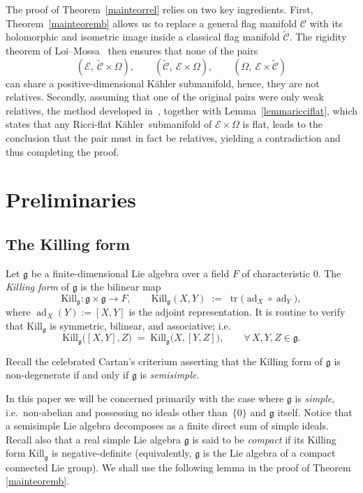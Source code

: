 \documentclass[reqno]{amsart}
\newcommand{\K}{K\"{a}hler}
\newcommand{\Kill}{{\mathrm{Kill}}}
\begin{document}
The proof of Theorem~\ref{mainteorrel} relies on two key ingredients.  
First, Theorem~\ref{mainteoremb} allows us to replace a general flag manifold 
\(\mathcal{C}\) with its holomorphic and isometric image inside a classical flag manifold 
\(\widetilde{\mathcal{C}}\). The rigidity theorem of Loi--Mossa~\cite[Thm.~1.1]{LMrighom} 
then ensures that none of the pairs
\[
(\mathcal{E},\ \widetilde{\mathcal{C}} \times \Omega),\qquad
(\widetilde{\mathcal{C}},\ \mathcal{E} \times \Omega),\qquad
(\Omega,\ \mathcal{E} \times \widetilde{\mathcal{C}})
\]
can share a positive-dimensional Kähler submanifold, hence, they are not relatives.
Secondly, assuming that one of the original pairs were only weak relatives, 
the method developed in~\cite{Placini2023}, together with Lemma~\ref{lemmaricciflat}, which 
states that any Ricci-flat \K\ submanifold of \(\mathcal{E} \times \Omega\) is flat, leads 
to the conclusion that the pair must in fact be relatives, yielding a contradiction and 
thus completing the proof.


\section{Preliminaries}\label{prel}

\subsection{The Killing form}
Let $\mathfrak g$ be a finite-dimensional Lie algebra over a field
$F$ of characteristic \(0\).
The \emph{Killing form} of $\mathfrak g$ is the bilinear map
\[
  \Kill_{\mathfrak g}\colon
  \mathfrak g\times\mathfrak g\longrightarrow F,
  \qquad
  \Kill_{\mathfrak g}(X,Y)\;:=\;
  \operatorname{tr}\!\bigl(\operatorname{ad}_X\circ\operatorname{ad}_Y\bigr),
\]
where
\(
  \operatorname{ad}_X(Y):=[X,Y]
\)
is the adjoint representation.
It is routine to verify that $\Kill_{\mathfrak g}$ is symmetric,
bilinear, and associative; i.e.  
\[
  \Kill_{\mathfrak g}\bigl([X,Y],Z\bigr)
  \;=\;
  \Kill_{\mathfrak g}\bigl(X,[Y,Z]\bigr),
  \qquad\forall\,X,Y,Z\in\mathfrak g.
\]

Recall the celebrated Cartan's criterium asserting that the Killing form of $\mathfrak g$ is non-degenerate
if and only if $\mathfrak g$ is \emph{semisimple}.

In this paper we will be concerned primarily with the case where $\mathfrak g$
is \emph{simple}, i.e.\ non-abelian and possessing no ideals other than
$\,\{0\}$ and $\mathfrak g$ itself.
Notice that a semisimple Lie algebra decomposes as a finite direct sum of simple ideals.
Recall also  that  a real simple Lie algebra $\mathfrak{g}$ is said to be  {\em compact} 
if  its  Killing form $\Kill_{\mathfrak g}$ is negative-definite (equivalently, $\mathfrak g$ is the Lie algebra
 of a compact connected Lie group). 
 We shall use the following lemma in the proof of Theorem \ref{mainteoremb}.
 
\end{document}
